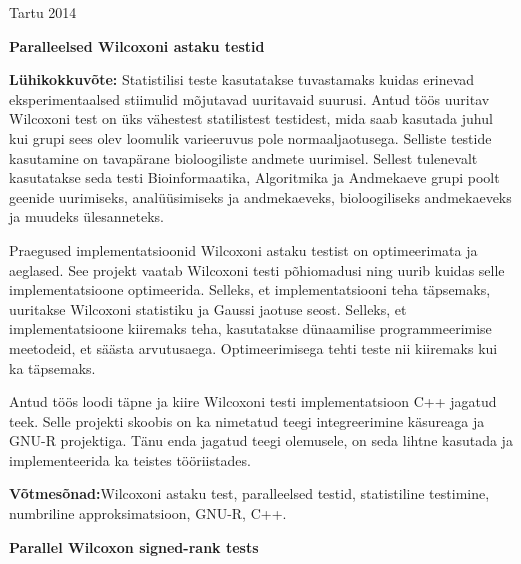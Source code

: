 \documentclass[12pt]{article}
\begin{document}
\vfill
\centerline{Tartu 2014}

\newpage
\thispagestyle{empty}
\phantom{Text to fill the page}

\newpage

\noindent\textbf{\large Paralleelsed Wilcoxoni astaku testid}
\vspace*{3ex}

\noindent\textbf{Lühikokkuvõte:}
Statistilisi teste kasutatakse tuvastamaks kuidas erinevad eksperimentaalsed stiimulid mõjutavad uuritavaid suurusi. Antud töös uuritav Wilcoxoni test on üks vähestest statilistest testidest, mida saab kasutada juhul kui grupi sees olev loomulik varieeruvus pole normaaljaotusega. Selliste testide kasutamine on tavapärane bioloogiliste andmete uurimisel. Sellest tulenevalt kasutatakse seda testi Bioinformaatika, Algoritmika ja Andmekaeve grupi poolt geenide uurimiseks, analüüsimiseks ja andmekaeveks, bioloogiliseks andmekaeveks ja muudeks ülesanneteks.

Praegused implementatsioonid Wilcoxoni astaku testist on optimeerimata ja aeglased. See projekt vaatab Wilcoxoni testi põhiomadusi ning uurib kuidas selle implementatsioone optimeerida. Selleks, et implementatsiooni teha täpsemaks, uuritakse Wilcoxoni statistiku ja Gaussi jaotuse seost. Selleks, et implementatsioone kiiremaks teha, kasutatakse dünaamilise programmeerimise meetodeid, et säästa arvutusaega. Optimeerimisega tehti teste nii kiiremaks kui ka täpsemaks.

Antud töös loodi täpne ja kiire Wilcoxoni testi implementatsioon C++ jagatud teek. Selle projekti skoobis on ka nimetatud teegi integreerimine käsureaga ja GNU-R projektiga. Tänu enda jagatud teegi olemusele, on seda lihtne kasutada ja implementeerida ka teistes tööriistades.
\vspace*{3ex}

\noindent\textbf{Võtmesõnad:}{Wilcoxoni astaku test, paralleelsed testid, statistiline testimine, numbriline approksimatsioon, GNU-R, C++.}
\vspace*{6ex}

\noindent\textbf{\large Parallel Wilcoxon signed-rank tests}
\vspace*{3ex}
\end{document}
